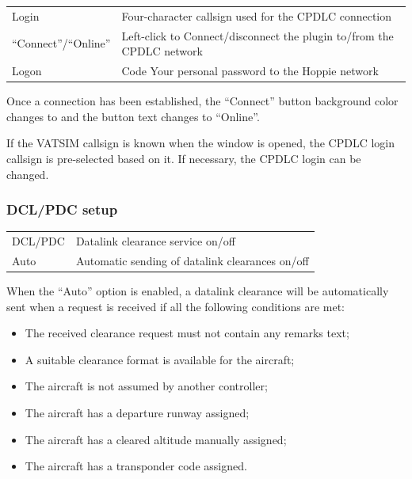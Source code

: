 \documentclass[a4paper,oneside,11pt]{memoir}
\begin{document}
\begin{longtable}{p{2.5cm} p{10cm}}
  Login               & Four-character callsign used for the CPDLC connection\\
  “Connect”/“Online”  & Left-click to Connect/disconnect the plugin to/from the CPDLC network\\
  Logon               & Code Your personal password to the Hoppie network\\
\end{longtable}

Once a connection has been established, the “Connect” button background color changes to  and the button text changes to “Online”.


If the VATSIM callsign is known when the window is opened, the CPDLC login callsign is pre-selected based on it. If necessary, the CPDLC login can be changed.

\subsubsection*{DCL/PDC setup}\label{win:dlsdcl}

\begin{longtable}{p{2.5cm} p{10cm}}
  DCL/PDC & Datalink clearance service on/off\\
  Auto    & Automatic sending of datalink clearances on/off\\
\end{longtable}


When the “Auto” option is enabled, a datalink clearance will be automatically sent when a request is received if all the following conditions are met:

\begin{itemize}
  \item The received clearance request must not contain any remarks text;\\
  \item A suitable clearance format is available for the aircraft;\\
  \item The aircraft is not assumed by another controller;\\
  \item The aircraft has a departure runway assigned;\\
  \item The aircraft has a cleared altitude manually assigned;\\
  \item The aircraft has a transponder code assigned.\\
\end{itemize}
\end{document}
